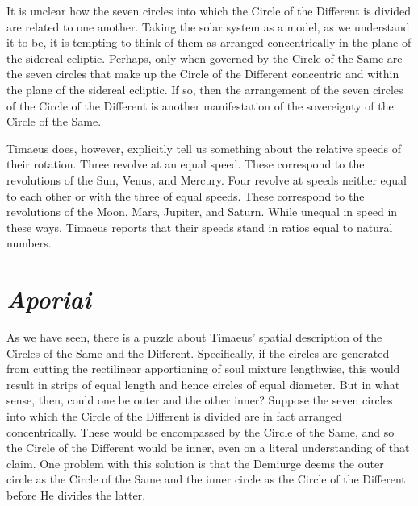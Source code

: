It is unclear how the seven circles into which the Circle of the Different is divided are related to one another. Taking the solar system as a model, as we understand it to be, it is tempting to think of them as arranged concentrically in the plane of the sidereal ecliptic. Perhaps, only when governed by the Circle of the Same are the seven circles that make up the Circle of the Different concentric and within the plane of the sidereal ecliptic. If so, then the arrangement of the seven circles of the Circle of the Different is another manifestation of the sovereignty of the Circle of the Same.

Timaeus does, however, explicitly tell us something about the relative speeds of their rotation. Three revolve at an equal speed. These correspond to the revolutions of the Sun, Venus, and Mercury. Four revolve at speeds neither equal to each other or with the three of equal speeds. These correspond to the revolutions of the Moon, Mars, Jupiter, and Saturn. While unequal in speed in these ways, Timaeus reports that their speeds stand in ratios equal to natural numbers.


\section{\emph{Aporiai}} %
\label{sec:aporiai}

As we have seen, there is a puzzle about Timaeus' spatial description of the Circles of the Same and the Different. Specifically, if the circles are generated from cutting the rectilinear apportioning of soul mixture lengthwise, this would result in strips of equal length and hence circles of equal diameter. But in what sense, then, could one be outer and the other inner? Suppose the seven circles into which the Circle of the Different is divided are in fact arranged concentrically. These would be encompassed by the Circle of the Same, and so the Circle of the Different would be inner, even on a literal understanding of that claim. One problem with this solution is that the Demiurge deems the outer circle as the Circle of the Same and the inner circle as the Circle of the Different before He divides the latter.

